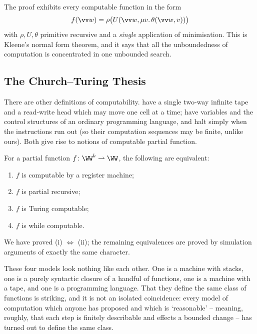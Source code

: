 \begin{remark}
	The proof exhibits every computable function in the form
	$$f(\vv w) = \rho\big(U(\vv w, \mu v.\,\theta(\vv w,v))\big)$$
	with $\rho, U, \theta$ primitive recursive and a \emph{single} application of minimisation. This is Kleene's normal form theorem, and it says that all the unboundedness of computation is concentrated in one unbounded search.
\end{remark}

\subsection{The Church--Turing Thesis}

There are other definitions of computability.  have a single two-way infinite tape and a read-write head which may move one cell at a time;  have variables and the control structures of an ordinary programming language, and halt simply when the instructions run out (so their computation sequences may be finite, unlike ours). Both give rise to notions of computable partial function.

\begin{theorem}\label{thm:equivalentmodels}
	For a partial function $f \colon \WW^k \rightharpoonup \WW$, the following are equivalent:
	\begin{enumerate}[label=(\roman*)]
		\item $f$ is computable by a register machine;
		\item $f$ is partial recursive;
		\item $f$ is Turing computable;
		\item $f$ is while computable.
	\end{enumerate}
\end{theorem}

We have proved (i) $\iff$ (ii); the remaining equivalences are proved by simulation arguments of exactly the same character.

These four models look nothing like each other. One is a machine with stacks, one is a purely syntactic closure of a handful of functions, one is a machine with a tape, and one is a programming language. That they define the same class of functions is striking, and it is not an isolated coincidence: every model of computation which anyone has proposed and which is `reasonable' -- meaning, roughly, that each step is finitely describable and effects a bounded change -- has turned out to define the same class.

